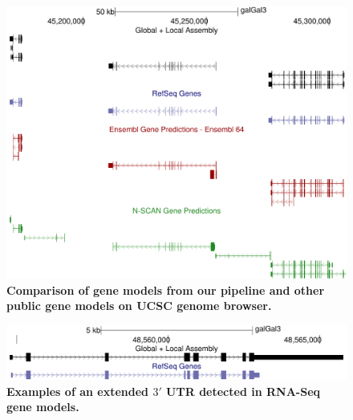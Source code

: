 \documentclass[10pt]{article}
\begin{document}
\begin{figure}[!ht]
\begin{center}
\includegraphics[width=5in]{model_comparisons.pdf}
\end{center}
\caption{
{\bf Comparison of gene models from our pipeline and other public gene models on UCSC genome browser.}
}
\label{model_comparisons}
\end{figure}

\begin{figure}[!ht]
\begin{center}
\includegraphics[width=5in]{long_utr.pdf}
\end{center}
\caption{
{\bf Examples of an extended $3'$ UTR detected in RNA-Seq gene models.}
}
\label{long_utr}
\end{figure}
\end{document}
